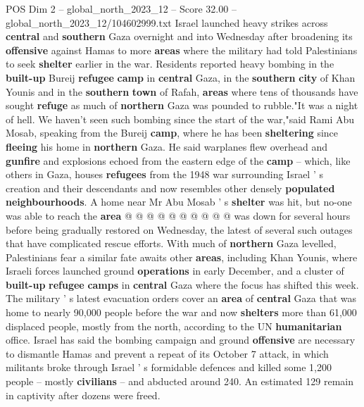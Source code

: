 \begin{textsample}{POS Dim 2 – global\_north\_2023\_12 – Score 32.00 – global\_north\_2023\_12/104602999.txt}  \label{ex:f2_pos_120}
Israel launched heavy strikes across \textbf{central} and \textbf{southern} Gaza overnight and into Wednesday after broadening its \textbf{offensive} against Hamas to more \textbf{areas} where the military had told Palestinians to seek \textbf{shelter} earlier in the war.
Residents reported heavy bombing in the \textbf{built-up} Bureij \textbf{refugee} \textbf{camp} in \textbf{central} Gaza, in the \textbf{southern} \textbf{city} of Khan Younis and in the \textbf{southern} \textbf{town} of Rafah, \textbf{areas} where tens of thousands have sought \textbf{refuge} as much of \textbf{northern} Gaza was pounded to rubble."It was a night of hell.
We haven't seen such bombing since the start of the war,"said Rami Abu Mosab, speaking from the Bureij \textbf{camp}, where he has been \textbf{sheltering} since \textbf{fleeing} his home in \textbf{northern} Gaza.
He said warplanes flew overhead and \textbf{gunfire} and explosions echoed from the eastern edge of the \textbf{camp} -- which, like others in Gaza, houses \textbf{refugees} from the 1948 war surrounding Israel ' s creation and their descendants and now resembles other densely \textbf{populated} \textbf{neighbourhoods}.
A home near Mr Abu Mosab ' s \textbf{shelter} was hit, but no-one was able to reach the \textbf{area} @ @ @ @ @ @ @ @ @ @ was down for several hours before being gradually restored on Wednesday, the latest of several such outages that have complicated rescue efforts.
With much of \textbf{northern} Gaza levelled, Palestinians fear a similar fate awaits other \textbf{areas}, including Khan Younis, where Israeli forces launched ground \textbf{operations} in early December, and a cluster of \textbf{built-up} \textbf{refugee} \textbf{camps} in \textbf{central} Gaza where the focus has shifted this week.
The military ' s latest evacuation orders cover an \textbf{area} of \textbf{central} Gaza that was home to nearly 90,000 people before the war and now \textbf{shelters} more than 61,000 displaced people, mostly from the north, according to the UN \textbf{humanitarian} office.
Israel has said the bombing campaign and ground \textbf{offensive} are necessary to dismantle Hamas and prevent a repeat of its October 7 attack, in which militants broke through Israel ' s formidable defences and killed some 1,200 people -- mostly \textbf{civilians} -- and abducted around 240.
An estimated 129 remain in captivity after dozens were freed.

\end{textsample}
